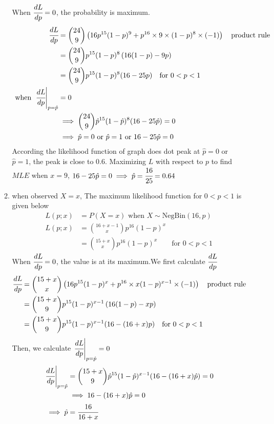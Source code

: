 \documentclass[12pt, oneside, a4paper]{article}
\begin{document}
\begin{enumerate}
\begin{enumerate}[label = (\alph*)]
			
			When $\cfrac{dL}{dp} = 0$, the probability is maximum. 
			 \begin{align*}
			 \cfrac{dL}{dp}& = \binom{24}{9}\left(16p^{15}(1-p)^9 + p^{16}\times 9 \times (1-p)^{8}\times (-1)\right) \quad \text{product rule} \\
			 & = \binom{24}{9}p^{15}(1-p)^{8}\left(16(1-p) - 9p\right) \\
			 & = \binom{24}{9}p^{15}(1-p)^{8}(16 - 25p) \quad \text{for } 0 < p < 1\\
			 \text{ when } \left.\cfrac{dL}{dp} \right |_{p = \hat{p}}&= 0 \\
			 &\implies\binom{24}{9}\hat{p}^{15}(1-\hat{p})^{8}(16 - 25\hat{p})  = 0 \\
			 &\implies \hat{p} = 0 \text{ or } \hat{p} = 1 \text{ or } 16 - 25\hat{p} = 0
			 \end{align*}
			According the likelihood function of graph does dot peak at  $\hat{p} = 0$ or $\hat{p} = 1$, the peak is close to $0.6$.
			Maximizing $L$ with respect to $p$ to find $MLE$ when $x = 9$, $16 - 25\hat{p} = 0 \implies \hat{p} =  \cfrac{16}{25} = 0.64$
			\item 
			when observed $X = x$, The maximum likelihood function for $0 < p < 1$ is given below
			\begin{align*}
			L(p;x) & = P(X = x) \text{ when } X \sim \text{NegBin}(16,p)\\
			L(p;x) & = \binom{16+x-1}{x}p^{16}(1-p)^x \\
			& = \binom{15+x}{x} p^{16}(1-p)^x \qquad \text{for } 0 < p < 1
			\end{align*}
			When $\cfrac{dL}{dp} = 0$, the value is at its maximum.We first calculate $\cfrac{dL}{dp}$
			\begin{align*}
			\cfrac{dL}{dp}& = \binom{15 +x}{x}\left(16p^{15}(1-p)^x + p^{16}\times x(1-p)^{x-1}\times (-1)\right) \quad \text{product rule} \\
			& = \binom{15+x}{9}p^{15}(1-p)^{x-1}\left(16(1-p) - xp\right) \\
			& = \binom{15+x}{9}p^{15}(1-p)^{x-1}(16 - (16+x)p) \quad \text{for } 0 < p < 1
			\end{align*}
			Then, we calculate $\left.	\cfrac{dL}{dp}\right | _{p = \hat{p}} = 0$
			\begin{align*}
			\left.	\cfrac{dL}{dp}\right | _{p = \hat{p}} & = \binom{15+x}{9}\hat{p}^{15}(1-\hat{p})^{x-1}(16 - (16+x)\hat{p}) = 0 \\
			& \implies 16 - (16+x)\hat{p} = 0 \\
			\implies \hat{p} & = \cfrac{16}{16+x}
			\end{align*}
			

\end{enumerate}
\end{enumerate}
\end{document}
